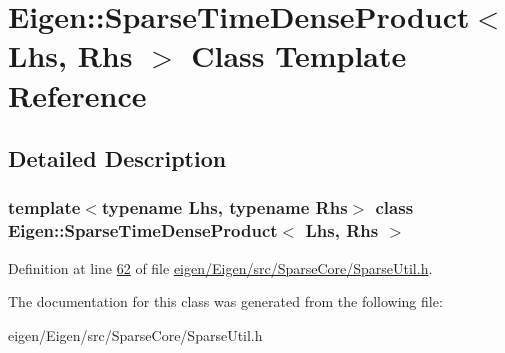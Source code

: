 \hypertarget{class_eigen_1_1_sparse_time_dense_product}{}\section{Eigen\+:\+:Sparse\+Time\+Dense\+Product$<$ Lhs, Rhs $>$ Class Template Reference}
\label{class_eigen_1_1_sparse_time_dense_product}


\subsection{Detailed Description}
\subsubsection*{template$<$typename Lhs, typename Rhs$>$\newline
class Eigen\+::\+Sparse\+Time\+Dense\+Product$<$ Lhs, Rhs $>$}



Definition at line \hyperlink{eigen_2_eigen_2src_2_sparse_core_2_sparse_util_8h_source_l00062}{62} of file \hyperlink{eigen_2_eigen_2src_2_sparse_core_2_sparse_util_8h_source}{eigen/\+Eigen/src/\+Sparse\+Core/\+Sparse\+Util.\+h}.



The documentation for this class was generated from the following file\+:\begin{DoxyCompactItemize}
\item 
eigen/\+Eigen/src/\+Sparse\+Core/\+Sparse\+Util.\+h\end{DoxyCompactItemize}
